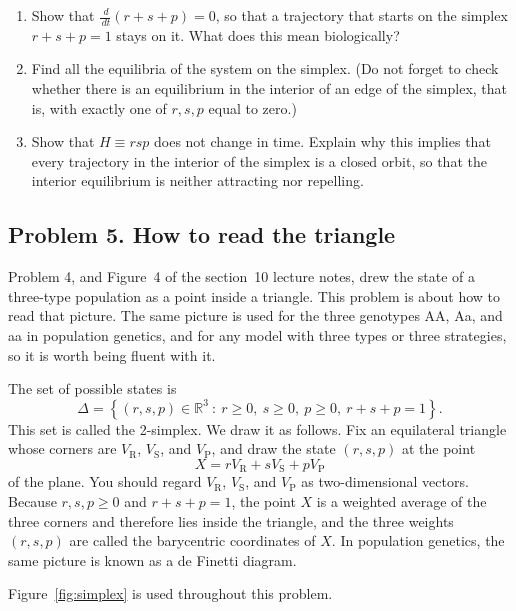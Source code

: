 \documentclass[a4paper,12pt]{article}
\newcommand{\dd}{\,d}
\newcommand{\R}{\mathbb{R}}
\begin{document}
\begin{enumerate}[label=(\alph*)]
\item Show that $\frac{\dd}{\dd t}\left( r+s+p \right)=0$, so that a trajectory that starts on the simplex $r+s+p=1$ stays on it. What does this mean biologically?

\item Find all the equilibria of the system on the simplex. (Do not forget to check whether there is an equilibrium in the interior of an edge of the simplex, that is, with exactly one of $r,s,p$ equal to zero.)

\item Show that $H \equiv rsp$ does not change in time. Explain why this implies that every trajectory in the interior of the simplex is a closed orbit, so that the interior equilibrium is neither attracting nor repelling.

\end{enumerate}

\subsection*{Problem 5. How to read the triangle}

Problem 4, and Figure~4 of the section~10 lecture notes, drew the state of a three-type population as a point inside a triangle. This problem is about how to read that picture. The same picture is used for the three genotypes AA, Aa, and aa in population genetics, and for any model with three types or three strategies, so it is worth being fluent with it.

The set of possible states is
\[ \Delta = \left\{ \left( r,s,p \right) \in \R^3 \ : \ r \geq 0, \ s \geq 0, \ p \geq 0, \ r+s+p=1 \right\} . \]
This set is called the 2-simplex. We draw it as follows. Fix an equilateral triangle whose corners are $V_{\text{R}}$, $V_{\text{S}}$, and $V_{\text{P}}$, and draw the state $\left( r,s,p \right)$ at the point
\[ X = r V_{\text{R}} + s V_{\text{S}} + p V_{\text{P}} \]
of the plane. You should regard $V_{\text{R}}$, $V_{\text{S}}$, and $V_{\text{P}}$ as two-dimensional vectors.
Because $r,s,p \geq 0$ and $r+s+p=1$, the point $X$ is a weighted average of the three corners and therefore lies inside the triangle, and the three weights $\left( r,s,p \right)$ are called the barycentric coordinates of $X$. In population genetics, the same picture is known as a de Finetti diagram.

Figure~\ref{fig:simplex} is used throughout this problem.
\end{document}
